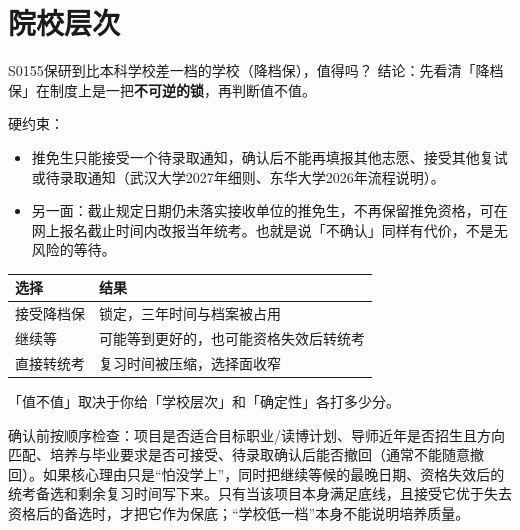 \section{院校层次}
\begin{qa}{S0155}{保研到比本科学校差一档的学校（降档保），值得吗？}
结论：先看清「降档保」在制度上是一把\textbf{不可逆的锁}，再判断值不值。

硬约束：
\begin{itemize}
  \item 推免生只能接受一个待录取通知，确认后不能再填报其他志愿、接受其他复试或待录取通知（武汉大学2027年细则、东华大学2026年流程说明）。
  \item 另一面：截止规定日期仍未落实接收单位的推免生，不再保留推免资格，可在网上报名截止时间内改报当年统考。也就是说「不确认」同样有代价，不是无风险的等待。
\end{itemize}

\par\vspace{2pt}\nobreak\begin{center}\footnotesize
\begin{tabularx}{\textwidth}{>{\raggedright\arraybackslash}X>{\raggedright\arraybackslash}X}
\toprule
\textbf{选择} & \textbf{结果} \\ \midrule
接受降档保 & 锁定，三年时间与档案被占用 \\
继续等 & 可能等到更好的，也可能资格失效后转统考 \\
直接转统考 & 复习时间被压缩，选择面收窄 \\
\bottomrule
\end{tabularx}
\end{center}\vspace{2pt}\par

「值不值」取决于你给「学校层次」和「确定性」各打多少分。

确认前按顺序检查：项目是否适合目标职业/读博计划、导师近年是否招生且方向匹配、培养与毕业要求是否可接受、待录取确认后能否撤回（通常不能随意撤回）。如果核心理由只是“怕没学上”，同时把继续等候的最晚日期、资格失效后的统考备选和剩余复习时间写下来。只有当该项目本身满足底线，且接受它优于失去资格后的备选时，才把它作为保底；“学校低一档”本身不能说明培养质量。
\end{qa}

